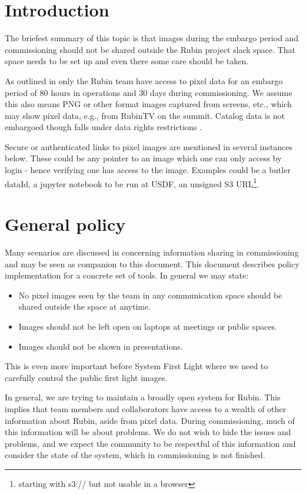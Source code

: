 
\section{Introduction}
The briefest summary of this topic is that images during the embargo period and commissioning should not be shared outside the Rubin project slack space.
That space needs to be set up and even there some care should be taken.

As outlined in  only the Rubin team have access to pixel data for an embargo period of 80 hours in operations and 30 days during commissioning. We assume this also means PNG or other format images captured from screens, etc., which may show pixel data, e.g., from RubinTV on the summit.
Catalog data is not embargoed though falls under data rights restrictions .

Secure or authenticated links to pixel images are mentioned in several instances below.
These could be any pointer to an image which one can only access by login - hence verifying one has access to the image. Examples could be a butler dataId, a jupyter notebook to be run at USDF, an unsigned S3 URL\footnote{starting with s3:// but not usable in a browser}.


\section{General policy} \label{sec:genpol}
Many scenarios are discussed in  concerning information sharing in commissioning and may be seen as companion to this document.
This document describes policy implementation for a concrete set of tools.
In general we may state:

\begin{itemize}
\item No pixel images seen by the team in any communication space should be shared outside the space at anytime.
\item Images should not be left open on laptops at meetings or public spaces.
\item Images should not be shown in presentations.
\end{itemize}

This is even more important before System First Light where we need to carefully control the public first light images.

In general, we are trying to maintain a broadly open system for Rubin.
This implies that team members and collaborators have access to a wealth of other information about Rubin, aside from pixel data.
During commissioning, much of this information will be about problems.
We do not wish to hide the issues and problems, and we expect the community to be respectful of this information and consider the state of the system, which in commissioning is not finished.

